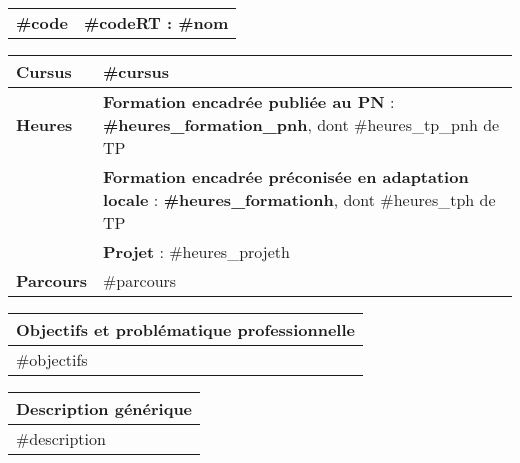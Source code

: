 
 \label{subsubsec:#codelatex}


\setlength{\tabcolsep}{0.125cm} %
\setlength{\extrarowheight}{2pt} %


\begin{tabular}[t]{|P|T|}
\hline %
	 \textcolor{compCAp!20!white}{\bfseries \hypertarget{#codelatex}{#code}}
    &  \textcolor{compCAp!20!white}{\bfseries #codeRT : #nom}
\\
\end{tabular}

\begin{tabular}[t]{|P|T|}
\hline %
	\textcolor{saeC}{\bfseries Cursus}
	& #cursus  \\
\hline %
\hline
    \textcolor{saeC}{\bfseries Heures}
    &
    \textcolor{saeC}{\bfseries Formation encadrée publiée au PN} : {\bfseries {#heures_formation_pn}h}, dont {#heures_tp_pn}h de TP \\ %
    &
    \textcolor{saeC}{\bfseries Formation encadrée préconisée en adaptation locale} : {\bfseries {#heures_formation}h}, dont {#heures_tp}h de TP \\
	& \textcolor{saeC}{\bfseries Projet} : {#heures_projet}h \\
\hline
\hline %
	\textcolor{saeC}{\bfseries Parcours}
	& #parcours \\
\hline
\end{tabular}

\begin{tabular}{|G|}
	\hline
	\textcolor{saeC}{\bfseries Objectifs et problématique professionnelle} \\
	\hline
	 #objectifs
	\\
\hline
\end{tabular}

\begin{tabular}{|G|}
	\textcolor{saeC}{\bfseries Description générique} \\
	\hline
    #description \\
\hline
\end{tabular}

